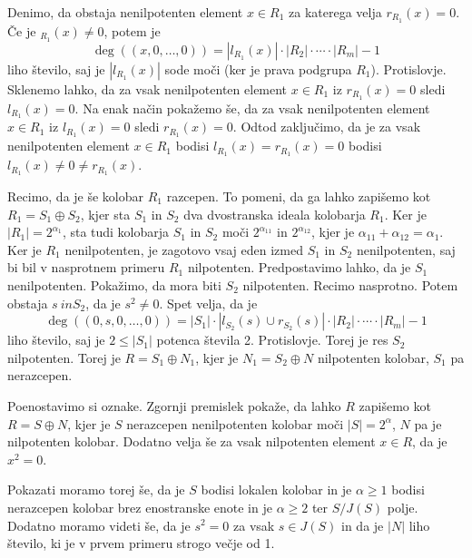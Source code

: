 \documentclass[a4paper, 12pt]{amsart}
\theoremstyle{definition} %
\theoremstyle{plain} %
\begin{document}
Denimo, da obstaja nenilpotenten element $x\in R_1$ za katerega velja $r_{R_1}(x) = 0$. Če je $_{R_1}(x) \neq 0$, potem je 
$$
\deg((x,0,\dots,0)) = |l_{R_1}(x)| \cdot |R_2| \cdot \cdots  \cdot |R_m| -1
$$  
liho število, saj je $|l_{R_1}(x)|$ sode moči (ker je prava podgrupa $R_1$). Protislovje. Sklenemo lahko, da za vsak nenilpotenten element $x\in R_1$ iz $r_{R_1}(x) = 0$ sledi $l_{R_1}(x) = 0$. Na enak način pokažemo še, da za vsak nenilpotenten element $x\in R_1$ iz $l_{R_1}(x) = 0$ sledi $r_{R_1}(x) = 0$. Odtod zaključimo, da je za vsak nenilpotenten element $x\in R_1$ bodisi $l_{R_1}(x) = r_{R_1}(x) = 0$ bodisi $l_{R_1}(x) \neq 0 \neq r_{R_1}(x)$.

Recimo, da je še kolobar $R_1$ razcepen. To pomeni, da ga lahko zapišemo kot $R_1 = S_1 \oplus S_2$, kjer sta $S_1$ in $S_2$ dva dvostranska ideala kolobarja $R_1$. Ker je $|R_1| = 2^{\alpha_1}$, sta tudi kolobarja $S_1$ in $S_2$ moči $2^{\alpha_{11}}$ in $2^{\alpha_{12}}$, kjer je $\alpha_{11} + \alpha_{12} = \alpha_1$. Ker je $R_1$ nenilpotenten, je zagotovo vsaj eden izmed $S_1$ in $S_2$ nenilpotenten, saj bi bil v nasprotnem primeru $R_1$ nilpotenten. Predpostavimo lahko, da je $S_1$ nenilpotenten. Pokažimo, da mora biti $S_2$ nilpotenten. Recimo nasprotno. Potem obstaja $s  \ in S_2$, da je $s^2 \neq 0$. Spet velja, da je 
$$
\deg((0,s,0,\dots,0)) = |S_1|\cdot |l_{S_2}(s) \cup r_{S_2}(s)| \cdot |R_2| \cdot \cdots \cdot |R_m| - 1
$$
liho število, saj je $2\le |S_1|$ potenca števila 2. Protislovje. Torej je res $S_2$ nilpotenten. Torej je $R= S_1 \oplus N_1$, kjer je $N_1 = S_2\oplus N$ nilpotenten kolobar, $S_1$ pa nerazcepen.

Poenostavimo si oznake. Zgornji premislek pokaže, da lahko $R$ zapišemo kot $R = S\oplus N$, kjer je $S$ nerazcepen nenilpotenten kolobar moči $|S| = 2^{\alpha}$, $N$ pa je nilpotenten kolobar. Dodatno velja še za vsak nilpotenten element $x\in R$, da je $x^2 = 0$.

Pokazati moramo torej še, da je $S$ bodisi lokalen kolobar in je $\alpha \ge 1$ bodisi nerazcepen kolobar brez enostranske enote in je $\alpha \ge 2$ ter $S/J(S)$ polje. Dodatno moramo videti še, da je $s^2 = 0$ za vsak $s\in J(S)$ in da je $|N|$ liho število, ki je v prvem primeru strogo večje od 1. 
\end{document}
